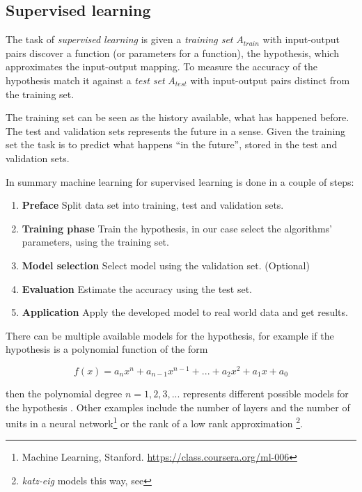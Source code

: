 
\subsection{Supervised learning}\label{sec:background:suplearn}

The task of \textit{supervised learning} is given a \textit{training set} $A_{train}$ with input-output pairs discover a function (or parameters for a function), the hypothesis, which approximates the input-output mapping.  To measure the accuracy of the hypothesis match it against a \textit{test set} $A_{test}$ with input-output pairs distinct from the training set.
\citep{norvigAI}

The training set can be seen as the history available, what has happened before. The test and validation sets represents the future in a sense. Given the training set the task is to predict what happens ``in the future'', stored in the test and validation sets.

In summary machine learning for supervised learning is done in a couple of steps:

\begin{enumerate}
    \item \textbf{Preface} Split data set into training, test and validation sets.
    \item \textbf{Training phase} Train the hypothesis, in our case select the algorithms' parameters, using the training set.
    \item \textbf{Model selection} Select model using the validation set. (Optional)
    \item \textbf{Evaluation} Estimate the accuracy using the test set.
    \item \textbf{Application} Apply the developed model to real world data and get results.
\end{enumerate}

There can be multiple available models for the hypothesis, for example if the hypothesis is a polynomial function of the form

\begin{equation}
f(x) = a_n x^n + a_{n - 1} x^{n - 1} + ... + a_2 x^2 + a_1 x + a_0
\end{equation}

then the polynomial degree $n = 1, 2, 3, ...$ represents different possible models for the hypothesis \citep{norvigAI}. Other examples include the number of layers and the number of units in a neural network\footnote{Machine Learning, Stanford. \url{https://class.coursera.org/ml-006}}
or the rank of a low rank approximation
\footnote{\textit{katz-eig} models this way, see }.

